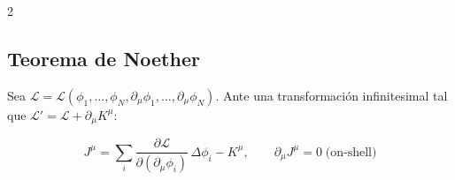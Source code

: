 \documentclass[a4paper, 12pt]{article}
\begin{document}
\begin{multicols}{2}
\subsection*{Teorema de Noether}

Sea $\mathcal{L} = \mathcal{L}(\phi_{1},\dots,\phi_{N}, \partial_{\mu}\phi_{1},\dots,\partial_{\mu}\phi_{N})$. Ante una transformación infinitesimal tal que $\mathcal{L}' = \mathcal{L} + \partial_{\mu}K^{\mu}$:

\begin{equation*}
    J^{\mu} = \sum_{i}
        \frac{\partial\mathcal{L}}{\partial(\partial_{\mu}\phi_{i})}
        \,\Delta\phi_{i} - K^{\mu},
    \qquad
    \partial_{\mu}J^{\mu} = 0
    \;\text{(on-shell)}
\end{equation*}

\end{multicols}
\end{document}

